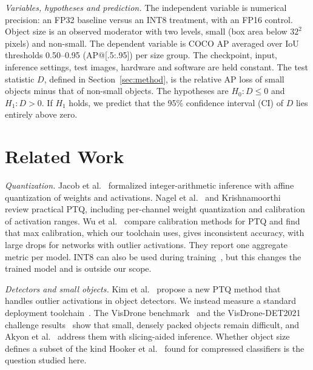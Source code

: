 \documentclass[conference]{IEEEtran}
\begin{document}
\emph{Variables, hypotheses and prediction.} The independent variable is numerical precision:
an FP32 baseline versus an INT8 treatment, with an FP16 control. Object size is an observed
moderator with two levels, small (box area below $32^2$ pixels) and non-small. The dependent
variable is COCO AP averaged over IoU thresholds 0.50--0.95 (AP@[.5:.95]) per size group. The
checkpoint, input, inference settings, test images,
hardware and software are held constant. The test statistic $D$, defined in
Section~\ref{sec:method}, is the relative AP loss of small objects minus that of non-small
objects. The hypotheses are $H_0\!: D\le 0$ and $H_1\!: D>0$. If $H_1$ holds, we predict that the
95\% confidence interval (CI) of $D$ lies entirely above zero.

\section{Related Work}
\label{sec:related-work}

\emph{Quantization.} Jacob et al.~\cite{jacob2018quantization} formalized integer-arithmetic
inference with affine quantization of weights and activations. Nagel et
al.~\cite{nagel2021whitepaper} and Krishnamoorthi~\cite{krishnamoorthi2018quantizing} review
practical PTQ, including per-channel weight quantization and calibration of activation ranges. Wu
et al.~\cite{wu2020integer} compare calibration methods for PTQ and find that max calibration,
which our toolchain uses, gives inconsistent accuracy, with large drops for networks with outlier
activations. They report one aggregate metric per model. INT8 can also be used
during training~\cite{zhu2020int8}, but this changes the trained model and is outside our scope.

\emph{Detectors and small objects.} Kim et al.~\cite{kim2026inlier} propose a new PTQ method that
handles outlier activations in object detectors. We instead measure a standard deployment
toolchain~\cite{ultralytics_tensorrt}. The VisDrone
benchmark~\cite{zhu2022visdrone} and the VisDrone-DET2021 challenge
results~\cite{cao2021visdrone} show that small, densely packed objects remain difficult, and
Akyon et al.~\cite{akyon2022sahi} address them with slicing-aided inference. Whether object
size defines a subset of the kind Hooker et al.~\cite{hooker2019forget} found for compressed
classifiers is the question studied here.

\end{document}
